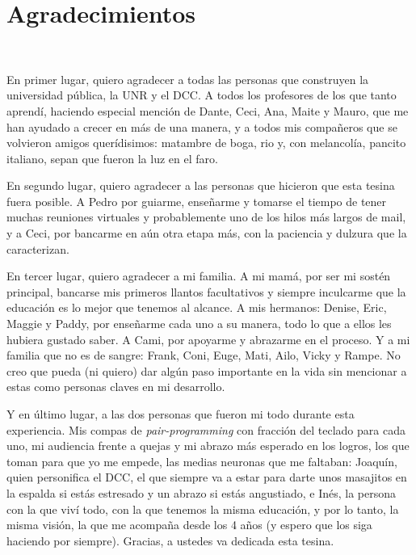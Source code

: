 \chapter*{Agradecimientos}
~\label{acknoledgements}

En primer lugar, quiero agradecer a todas las personas que construyen la
universidad pública, la UNR y el DCC. A todos los profesores de los que tanto
aprendí, haciendo especial mención de Dante, Ceci, Ana, Maite y Mauro, que me
han ayudado a crecer en más de una manera, y a todos mis compañeros que se
volvieron amigos querídisimos: matambre de boga, rio y, con melancolía, pancito
italiano, sepan que fueron la luz en el faro.

En segundo lugar, quiero agradecer a las personas que hicieron que esta tesina
fuera posible. A Pedro por guiarme, enseñarme y tomarse el tiempo de tener
muchas reuniones virtuales y probablemente uno de los hilos más largos de mail,
y a Ceci, por bancarme en aún otra etapa más, con la paciencia y dulzura que la
caracterizan.

En tercer lugar, quiero agradecer a mi familia. A mi mamá, por ser mi sostén
principal, bancarse mis primeros llantos facultativos y siempre inculcarme que
la educación es lo mejor que tenemos al alcance. A mis hermanos: Denise, Eric,
Maggie y Paddy, por enseñarme cada uno a su manera, todo lo que a ellos les
hubiera gustado saber. A Cami, por apoyarme y abrazarme en el proceso. Y a mi
familia que no es de sangre: Frank, Coni, Euge, Mati, Ailo, Vicky y Rampe. No
creo que pueda (ni quiero) dar algún paso importante en la vida sin mencionar a
estas como personas claves en mi desarrollo.

Y en último lugar, a las dos personas que fueron mi todo durante esta
experiencia. Mis compas de \textit{pair-programming} con fracción del teclado
para cada uno, mi audiencia frente a quejas y mi abrazo más esperado en los
logros, los que toman para que yo me empede, las medias neuronas que me
faltaban: Joaquín, quien personifica el DCC, el que siempre va a estar para
darte unos masajitos en la espalda si estás estresado y un abrazo si estás
angustiado, e Inés, la persona con la que viví todo, con la que tenemos la
misma educación, y por lo tanto, la misma visión, la que me acompaña desde los
4 años (y espero que los siga haciendo por siempre). Gracias, a ustedes va
dedicada esta tesina.